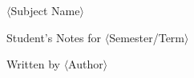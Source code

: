 \thispagestyle{empty}

\begin{center}
\vspace{5cm}

\Huge{$\langle$Subject Name$\rangle$}

\vspace{5em}

\Large Student's Notes for {$\langle$Semester/Term$\rangle$}

\Large Written by {$\langle$Author$\rangle$}
\end{center}
